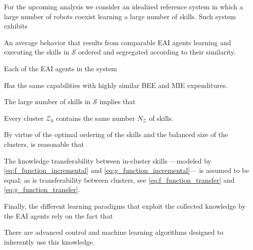 For the upcoming analysis we consider an idealized reference system in which a large number of robots coexist learning a large number of skills. Such system exhibits
\begin{tcolorbox}
	\begin{assumption}\label{assumption:average_behavior}
		An average behavior that results from comparable EAI agents learning and executing the skills in $\mathcal{S}$ ordered and segregated according to their similarity.
	\end{assumption}
\end{tcolorbox}
Each of the EAI agents in the system
\begin{tcolorbox}
	\begin{assumption}\label{assumption:agent_similarity}
		Has the same capabilities with highly similar BEE and MIE expenditures.
	\end{assumption}
\end{tcolorbox}
The large number of skills in $\mathcal{S}$ implies that
\begin{tcolorbox}
	\begin{assumption}\label{assumption:cluster_size}
		Every cluster $\mathcal{Z}_{k}$ contains the same number $N_{\mathcal{Z}} $ of skills.
	\end{assumption}
\end{tcolorbox}
By virtue of the optimal ordering of the skills and the balanced size of the clusters, is reasonable that
\begin{tcolorbox}
	\begin{assumption}\label{assumption:cluster_transferability}
		The knowledge transferability between in-cluster skills ---modeled by \eqref{eq:f_function_incremental} and \eqref{eq:g_function_incremental}--- is assumed to be equal; as is transferability between clusters, see \eqref{eq:f_function_transfer} and \eqref{eq:g_function_transfer}.
	\end{assumption}
\end{tcolorbox}
Finally, the different learning paradigms that exploit the collected knowledge by the EAI agents rely on the fact that
\begin{tcolorbox}
	\begin{assumption}\label{assumption:enabling_agorithms}
	There are advanced control and machine learning algorithms designed to inherently use this knowledge.
	\end{assumption}
\end{tcolorbox}

